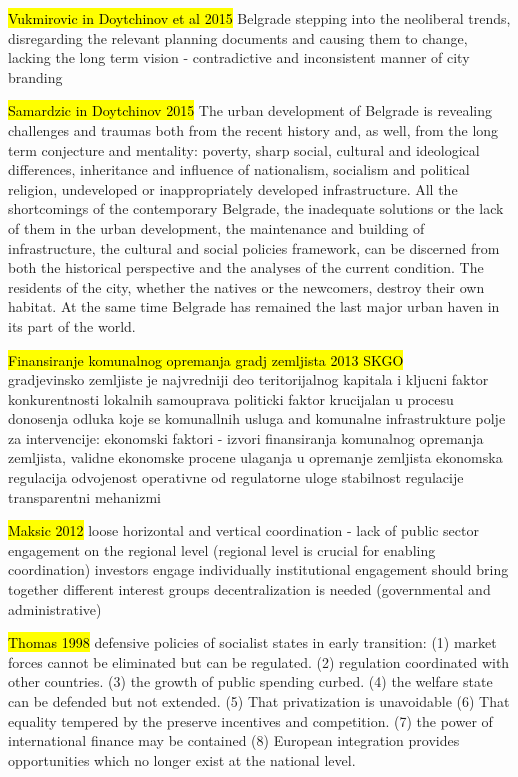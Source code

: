 \documentclass[11pt]{report}
\begin{document}
	\hl{Vukmirovic in Doytchinov et al 2015}
Belgrade stepping into the neoliberal trends, disregarding the relevant planning documents and causing them to change, lacking the long term vision - contradictive and inconsistent manner of  city branding

\hl{Samardzic in Doytchinov 2015} 
The  urban  development  of  Belgrade  is  revealing  challenges  and  traumas both from the recent history and, as well, from the long term conjecture and mentality: poverty, sharp social, cultural and ideological differences, inheritance and influence of nationalism, socialism and political religion, undeveloped or inappropriately developed infrastructure.
All the shortcomings of the contemporary Belgrade, the inadequate solutions or the lack of them in the urban development, the maintenance and building of infrastructure, the cultural and social policies framework, can be discerned from both the historical perspective and the analyses of the current condition. 
The residents of the city, whether the natives or the newcomers, destroy their own habitat. At the same time Belgrade has remained the last major urban haven in its part of the world. 

\hl{Finansiranje komunalnog opremanja gradj zemljista 2013 SKGO}\\
gradjevinsko zemljiste je najvredniji deo teritorijalnog kapitala i kljucni faktor konkurentnosti lokalnih samouprava
politicki faktor krucijalan u procesu donosenja odluka koje se komunallnih usluga and komunalne infrastrukture
polje za intervencije: ekonomski faktori  - izvori finansiranja komunalnog opremanja zemljista, validne ekonomske procene ulaganja u opremanje zemljista
ekonomska regulacija
    odvojenost operativne od regulatorne uloge
    stabilnost regulacije
    transparentni mehanizmi
    
\hl{Maksic 2012}
    loose horizontal and vertical coordination - lack of public sector engagement on the regional level (regional level is crucial for enabling coordination)
    investors engage individually
    institutional engagement should bring together different interest groups
    decentralization is needed (governmental and administrative)
    
\hl{Thomas 1998}
defensive policies of socialist states in early transition:
(1) market  forces  cannot  be  eliminated  but  can  be  regulated.
(2) regulation coordinated  with  other  countries.
(3) the growth  of public  spending curbed.
(4) the welfare  state can be defended  but  not  extended.
(5)  That  privatization  is  unavoidable
(6)  That  equality tempered  by  the  preserve incentives  and  competition.
(7) the  power  of  international  finance  may  be  contained
(8) European  integration  provides  opportunities  which  no longer  exist  at the national  level.
\end{document}
